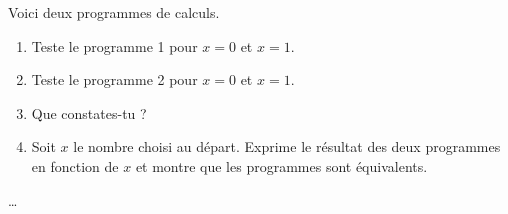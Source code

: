 \begin{exercice*}
    Voici deux programmes de calculs.


    \begin{enumerate}
        \item Teste le programme 1 pour $x = 0$ et $x = 1$.
        \item Teste le programme 2 pour $x = 0$ et $x = 1$.
        \item Que constates-tu ?
        \item Soit $x$ le nombre choisi au départ. Exprime le résultat des deux programmes en fonction de $x$ et montre que les programmes sont équivalents.
    \end{enumerate}
\end{exercice*}
\begin{corrige}
    \dots
\end{corrige}

